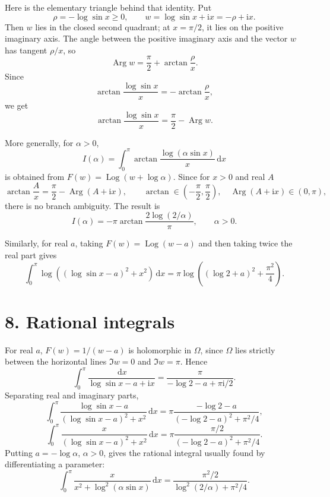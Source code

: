 \documentclass[12pt]{article}
\newcommand{\dd}{\,\mathrm{d}}
\newcommand{\ii}{\mathrm{i}}
\newcommand{\Log}{\operatorname{Log}}
\newcommand{\Arg}{\operatorname{Arg}}
\begin{document}
Here is the elementary triangle behind that identity. Put
\[
\rho=-\log\sin x\ge0,\qquad w=\log\sin x+\ii x=-\rho+\ii x.
\]
Then \(w\) lies in the closed second quadrant; at \(x=\pi/2\), it lies on
the positive imaginary axis. The angle between the positive imaginary axis
and the vector \(w\) has tangent \(\rho/x\), so
\[
\Arg w=\frac{\pi}{2}+\arctan\frac{\rho}{x}.
\]
Since
\[
\arctan\frac{\log\sin x}{x}
=-\arctan\frac{\rho}{x},
\]
we get
\[
\arctan\frac{\log\sin x}{x}
=\frac{\pi}{2}-\Arg w.
\]

\begin{center}
\end{center}

More generally, for \(\alpha>0\),
\[
I(\alpha)=\int_0^\pi
\arctan\frac{\log(\alpha\sin x)}{x}\dd x
\]
is obtained from \(F(w)=\Log(w+\log\alpha)\). Since for \(x>0\) and real
\(A\)
\[
\arctan\frac{A}{x}
=\frac{\pi}{2}-\Arg(A+\ii x),
\qquad
\arctan\in\left(-\frac{\pi}{2},\frac{\pi}{2}\right),
\quad
\Arg(A+\ii x)\in(0,\pi),
\tag{17}
\]
there is no branch ambiguity. The result is
\[
\boxed{\displaystyle
I(\alpha)
=-\pi\arctan\frac{2\log(2/\alpha)}{\pi},
\qquad \alpha>0.}
\tag{18}
\]

Similarly, for real \(a\), taking \(F(w)=\Log(w-a)\) and then taking twice
the real part gives
\[
\boxed{\displaystyle
\int_0^\pi
\log\!\left((\log\sin x-a)^2+x^2\right)\dd x
=
\pi\log\!\left((\log2+a)^2+\frac{\pi^2}{4}\right).}
\tag{19}
\]

\section*{8. Rational integrals}

For real \(a\), \(F(w)=1/(w-a)\) is holomorphic in \(\Omega\), since
\(\Omega\) lies strictly between the horizontal lines \(\Im w=0\) and
\(\Im w=\pi\). Hence
\[
\boxed{\displaystyle
\int_0^\pi
\frac{\dd x}{\log\sin x-a+\ii x}
=
\frac{\pi}{-\log2-a+\pi\ii/2}.}
\tag{20}
\]
Separating real and imaginary parts,
\[
\boxed{\displaystyle
\int_0^\pi
\frac{\log\sin x-a}{(\log\sin x-a)^2+x^2}\dd x
=
\pi\frac{-\log2-a}{(-\log2-a)^2+\pi^2/4},}
\tag{21}
\]
\[
\boxed{\displaystyle
\int_0^\pi
\frac{x}{(\log\sin x-a)^2+x^2}\dd x
=
\pi\frac{\pi/2}{(-\log2-a)^2+\pi^2/4}.}
\tag{22}
\]
Putting \(a=-\log\alpha\), \(\alpha>0\), gives the rational integral
usually found by differentiating a parameter:
\[
\boxed{\displaystyle
\int_0^\pi
\frac{x}{x^2+\log^2(\alpha\sin x)}\dd x
=
\frac{\pi^2/2}{\log^2(2/\alpha)+\pi^2/4}.}
\tag{23}
\]
\end{document}
